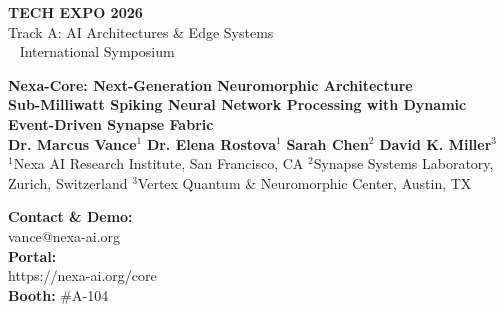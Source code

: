 \documentclass[final]{beamer}
\begin{document}
\begin{frame}[t]

\begin{tcolorbox}[
  enhanced,
  colback=BannerBg,
  colframe=BorderCyan,
  arc=12pt,
  boxrule=2.5pt,
  top=24pt,
  bottom=24pt,
  left=30pt,
  right=30pt
]
  \begin{minipage}{0.18\textwidth}
    \begin{tcolorbox}[
      enhanced,
      colback=HeaderBg,
      colframe=BorderPurple,
      arc=8pt,
      boxrule=1.5pt,
      halign=center
    ]
      \textcolor{BorderCyan}{\Large\faMicrochip} \;\textbf{\textcolor{TextWhite}{TECH EXPO 2026}}\\[4pt]
      \textcolor{TextMuted}{\small Track A: AI Architectures \& Edge Systems}\\[6pt]
      \textcolor{HighlightGold}{\footnotesize\faAtom ~ International Symposium}
    \end{tcolorbox}
  \end{minipage}\hfill
  \begin{minipage}{0.62\textwidth}
    \centering
    {\Huge \bfseries \textcolor{TextWhite}{Nexa-Core: Next-Generation Neuromorphic Architecture}}\\[12pt]
    {\Large \bfseries \textcolor{BorderCyan}{Sub-Milliwatt Spiking Neural Network Processing with Dynamic Event-Driven Synapse Fabric}}\\[16pt]
    {\large \textcolor{TextLight}{%
      \textbf{Dr. Marcus Vance}$^{1}$ \quad
      \textbf{Dr. Elena Rostova}$^{1}$ \quad
      \textbf{Sarah Chen}$^{2}$ \quad
      \textbf{David K. Miller}$^{3}$%
    }}\\[8pt]
    {\small \textcolor{TextMuted}{%
      $^{1}$Nexa AI Research Institute, San Francisco, CA \quad
      $^{2}$Synapse Systems Laboratory, Zurich, Switzerland \quad
      $^{3}$Vertex Quantum \& Neuromorphic Center, Austin, TX%
    }}
  \end{minipage}\hfill
  \begin{minipage}{0.16\textwidth}
    \begin{tcolorbox}[
      enhanced,
      colback=HeaderBg,
      colframe=BorderCyan,
      arc=8pt,
      boxrule=1.5pt,
      halign=left
    ]
      \textcolor{BorderCyan}{\faEnvelope} \;\textbf{\textcolor{TextWhite}{\small Contact \& Demo:}}\\[2pt]
      \textcolor{TextLight}{\footnotesize vance@nexa-ai.org}\\[4pt]
      \textcolor{BorderCyan}{\faGlobe} \;\textbf{\textcolor{TextWhite}{\small Portal:}}\\[2pt]
      \textcolor{TextLight}{\footnotesize https://nexa-ai.org/core}\\[4pt]
      \textcolor{BorderCyan}{\faRocket} \;\textbf{\textcolor{TextWhite}{\small Booth:}} \textcolor{HighlightGold}{\small \#A-104}
    \end{tcolorbox}
  \end{minipage}
\end{tcolorbox}


\end{frame}
\end{document}
